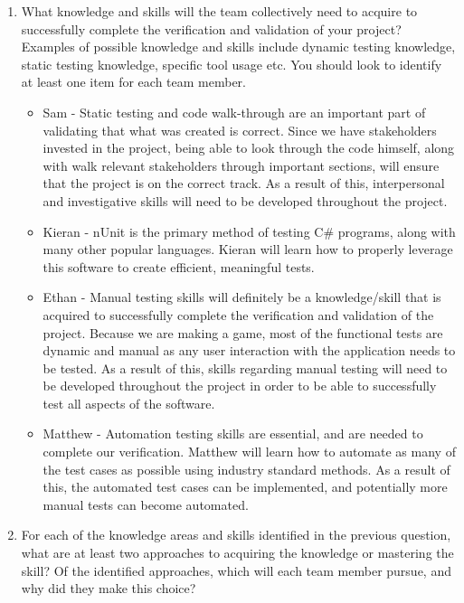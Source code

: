 \documentclass[12pt, titlepage]{article}
\begin{document}
\begin{enumerate}
  \item What knowledge and skills will the team collectively need to acquire to
  successfully complete the verification and validation of your project?
  Examples of possible knowledge and skills include dynamic testing knowledge,
  static testing knowledge, specific tool usage etc.  You should look to
  identify at least one item for each team member.


  \begin{itemize}
      \item Sam - Static testing and code walk-through are an important part of validating that what was created is correct. Since we have stakeholders invested in the project, being able to look through the code himself, along with walk relevant stakeholders through important sections, will ensure that the project is on the correct track. As a result of this, interpersonal and investigative skills will need to be developed throughout the project. 
      \item Kieran - nUnit is the primary method of testing C\# programs, along with many other popular languages. Kieran will learn how to properly leverage this software to create efficient, meaningful tests. 
      \item Ethan - Manual testing skills will definitely be a knowledge/skill that is acquired to successfully complete the verification and validation of the project. Because we are making a game, most of the functional tests are dynamic and manual as any user interaction with the application needs to be tested. As a result of this, skills regarding manual testing will need to be developed throughout the project in order to be able to successfully test all aspects of the software.
      \item Matthew - Automation testing skills are essential, and are needed to complete our verification. Matthew will learn how to automate as many of the test cases as possible using industry standard methods. As a result of this, the automated test cases can be implemented, and potentially more manual tests can become automated. 

  \end{itemize}

  
  \item For each of the knowledge areas and skills identified in the previous
  question, what are at least two approaches to acquiring the knowledge or
  mastering the skill?  Of the identified approaches, which will each team
  member pursue, and why did they make this choice?


\end{enumerate}
\end{document}
